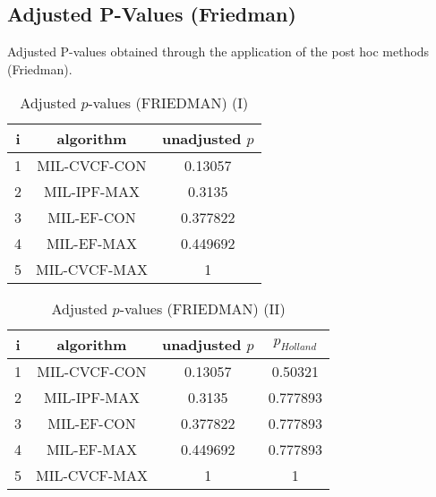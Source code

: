 \documentclass[a4paper,10pt]{article}
\begin{document}
\begin{landscape}
\newpage

\section{Adjusted P-Values (Friedman)}


Adjusted P-values obtained through the application of the post hoc methods (Friedman).

\begin{table}[!htp]
\centering\small
\begin{tabular}{ccc}
i&algorithm&unadjusted $p$\\
\hline1&MIL-CVCF-CON&0.13057\\2&MIL-IPF-MAX&0.3135\\3&MIL-EF-CON&0.377822\\4&MIL-EF-MAX&0.449692\\5&MIL-CVCF-MAX&1\\\hline
\end{tabular}
\caption{Adjusted $p$-values (FRIEDMAN) (I)}
\end{table}
\begin{table}[!htp]
\centering\small
\begin{tabular}{cccc}
i&algorithm&unadjusted $p$&$p_{Holland}$\\
\hline1&MIL-CVCF-CON&0.13057&0.50321\\2&MIL-IPF-MAX&0.3135&0.777893\\3&MIL-EF-CON&0.377822&0.777893\\4&MIL-EF-MAX&0.449692&0.777893\\5&MIL-CVCF-MAX&1&1\\\hline
\end{tabular}
\caption{Adjusted $p$-values (FRIEDMAN) (II)}
\end{table}

\newpage
\end{landscape}
\end{document}
